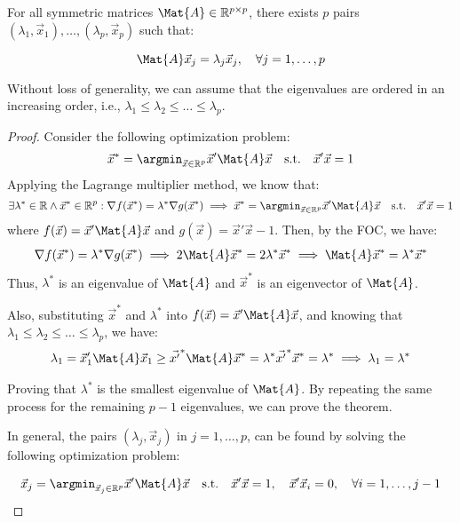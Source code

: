 \begin{theorem}
    For all symmetric matrices $\Mat{A} \in \mathbb{R}^{p \times p}$, there exists $p$ pairs $(\lambda_1, \Vec{x}_1), \ldots, (\lambda_p, \Vec{x}_p)$ such that:

    \[
        \Mat{A}\Vec{x}_j = \lambda_j\Vec{x}_j, \quad \forall j = 1, \ldots, p 
    \]

    Without loss of generality, we can assume that the eigenvalues are ordered in an increasing order, i.e., $\lambda_1 \leq \lambda_2 \leq \ldots \leq \lambda_p$.
\end{theorem}
\begin{proof}
    Consider the following optimization problem:
    \begin{align*}
        \Vec{x}^* = \argmin_{\Vec{x} \in \mathbb{R}^p} \Vec{x}'\Mat{A}\Vec{x} \quad \text{s.t.} \quad \Vec{x}'\Vec{x} = 1
    \end{align*}
    Applying the Lagrange multiplier method, we know that: 
    \begin{align*}
        \exists \lambda^* \in \mathbb{R} \land \Vec{x}^* \in \mathbb{R}^p:
        \nabla f(\Vec{x}^*) = \lambda^* \nabla g(\Vec{x}^*)
        \implies
        \Vec{x}^* = \argmin_{\Vec{x} \in \mathbb{R}^p} \Vec{x}'\Mat{A}\Vec{x} \quad \text{s.t.} \quad \Vec{x}'\Vec{x} = 1
    \end{align*}
    where $f(\Vec{x}) = \Vec{x}'\Mat{A}\Vec{x}$ and $g(\Vec{x}) = \Vec{x}'\Vec{x} - 1$. Then, by the FOC, we have:
    \begin{align*}
        \nabla f(\Vec{x}^*) = \lambda^* \nabla g(\Vec{x}^*)
        \implies
        2\Mat{A}\Vec{x}^* = 2\lambda^* \Vec{x}^*
        \implies
        \Mat{A}\Vec{x}^* = \lambda^* \Vec{x}^*
    \end{align*}
    Thus, $\lambda^*$ is an eigenvalue of $\Mat{A}$ and $\Vec{x}^*$ is an eigenvector of $\Mat{A}$.

    Also, substituting $\Vec{x}^*$ and $\lambda^*$ into $f(\Vec{x}) = \Vec{x}'\Mat{A}\Vec{x}$, and knowing that $\lambda_1 \leq \lambda_2 \leq \ldots \leq \lambda_p$, we have:
    \begin{align*}
        \lambda_1 = \Vec{x}_1'\Mat{A}\Vec{x}_1 \geq \Vec{x'}^*  \Mat{A} \Vec{x}^* = \lambda^* \Vec{x'}^* \Vec{x}^* = \lambda^* \implies \lambda_1 = \lambda^*
    \end{align*}

    Proving that $\lambda^*$ is the smallest eigenvalue of $\Mat{A}$. By repeating the same process for the remaining $p-1$ eigenvalues, we can prove the theorem.

    In general, the pairs $(\lambda_j, \Vec{x}_j)$ in $j = 1, \ldots, p$, can be found by solving the following optimization problem:

    \begin{align*}
        \Vec{x}_j = \argmin_{\Vec{x}_j \in \mathbb{R}^p} \Vec{x}'\Mat{A}\Vec{x} \quad \text{s.t.} \quad \Vec{x}'\Vec{x} = 1, \quad \Vec{x}'\Vec{x}_i = 0, \quad \forall i = 1, \ldots, j-1
    \end{align*}
\end{proof}